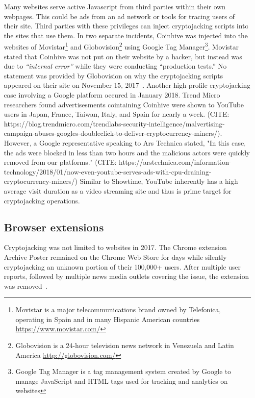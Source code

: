 Many websites serve active Javascript from third parties within their own webpages. This could be ads from an ad network or tools for tracing users of their site. Third parties with these privileges can inject cryptojacking scripts into the sites that use them. In two separate incidents, Coinhive was injected into the websites of Movistar\footnote{Movistar is a major telecommunications brand owned by Telefonica, operating in Spain and in many Hispanic American countries \url{https://www.movistar.com/}} and Globovision\footnote{Globovision is a 24-hour television news network in Venezuela and Latin America \url{http://globovision.com/}} using Google Tag Manager\footnote{Google Tag Manager is a tag management system created by Google to manage JavaScript and HTML tags used for tracking and analytics on websites}. Movistar stated that Coinhive was not put on their website by a hacker, but instead was due to \textit{``internal error''} while they were conducting ``production tests.'' No statement was provided by Globovision on why the cryptojacking scripts appeared on their site on November 15, 2017~\cite{googletagcoinhive}. Another high-profile cryptojacking case involving a Google platform occured in January 2018. Trend Micro researchers found advertisesments cointaining Coinhive were shown to YouTube users in Japan, France, Taiwan, Italy, and Spain for nearly a week. (CITE: https://blog.trendmicro.com/trendlabs-security-intelligence/malvertising-campaign-abuses-googles-doubleclick-to-deliver-cryptocurrency-miners/). However, a Google representative speaking to Ars Technica stated, "In this case, the ads were blocked in less than two hours and the malicious actors were quickly removed from our platforms." (CITE: https://arstechnica.com/information-technology/2018/01/now-even-youtube-serves-ads-with-cpu-draining-cryptocurrency-miners/) Similar to Showtime, YouTube inherently has a high average visit duration as a video streaming site and thus is prime target for cryptojacking operations.


\subsection{Browser extensions} 

Cryptojacking was not limited to websites in 2017. The Chrome extension Archive Poster remained on the Chrome Web Store for days while silently cryptojacking an unknown portion of their 100,000+ users. After multiple user reports, followed by multiple news media outlets covering the issue, the extension was removed~\cite{chromeextentioncoinhive}. 


